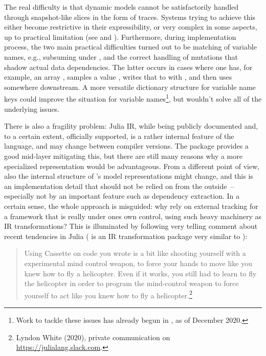 The real difficulty is that dynamic models cannot be satisfactorily handled through snapshot-like
slices in the form of traces.  Systems trying to achieve this either become restrictive in their
expressibility, or very complex in some aspects, up to practical limitation (see
\textcite{mansinghka2014venture} and \textcite{goodman2012church}).  Furthermore, during
implementation process, the two main practical difficulties turned out to be matching of variable
names, e.g., subsuming  under , and the correct handling of
mutations that shadow actual data dependencies.  The latter occurs in cases where one has, for
example, an array , samples a value , writes that to  with
, and then uses  somewhere downstream.  A more versatile
dictionary structure for variable name keys could improve the situation for variable
names\footnote{Work to tackle these issues has already begun in \turingjl{}, as of December 2020.},
but wouldn't solve all of the underlying issues.

There is also a fragility problem: Julia IR, while being publicly documented and, to a certain
extent, officially supported, is a rather internal feature of the language, and may change between
compiler versions.  The  package provides a good mid-layer mitigating this,
but there are still many reasons why a more specialized representation would be advantageous.  From
a different point of view, also the internal structure of \dppljl{}'s model representations might
change, and this is an implementation detail that should not be relied on from the outside~--
especially not by an important feature such as dependency extraction.  In a certain sense, the whole
approach is misguided: why rely on external tracking for a framework that is really under ones own
control, using such heavy machinery as IR transformations?  This is illuminated by following very
telling comment about recent tendencies in Julia ( is an IR transformation
package very similar to ):
\begin{quote}
  Using Cassette on code you wrote is a bit like shooting yourself with a experimental mind control
  weapon, to force your hands to move like you knew how to fly a helicopter.  Even if it works, you
  still had to learn to fly the helicopter in order to program the mind-control weapon to force
  yourself to act like you knew how to fly a helicopter.\footnote{Lyndon White (2020), private
    communication on \protect\url{https://julialang.slack.com}.}
\end{quote}


